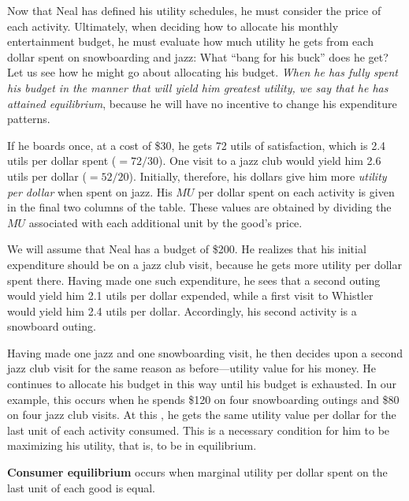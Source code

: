 



Now that Neal has defined his utility schedules, he must consider the price of each activity. Ultimately, when deciding how to allocate his monthly entertainment budget, he must evaluate how much utility he gets from each dollar spent on snowboarding and jazz: What ``bang for his buck'' does he get? Let us see how he might go about allocating his budget. \textit{When he has fully spent his budget in the manner that will yield him greatest utility, we say that he has attained equilibrium}, because he will have no incentive to change his expenditure patterns.

If he boards once, at a cost of \$30, he gets 72 utils of satisfaction, which is 2.4 utils per dollar spent ($=72/30$). One visit to a jazz club would yield him 2.6 utils per dollar ($=52/20$). Initially, therefore, his dollars give him more \textit{utility per dollar} when spent on jazz. His $MU$ per dollar spent on each activity is given in the final two columns of the table. These values are obtained by dividing the $MU$ associated with each additional unit by the good's price.

We will assume that Neal has a budget of \$200. He realizes that his initial expenditure should be on a jazz club visit, because he gets more utility per dollar spent there. Having made one such expenditure, he sees that a second outing would yield him 2.1 utils per dollar expended, while a first visit to Whistler would yield him 2.4 utils per dollar. Accordingly, his second activity is a snowboard outing.

Having made one jazz and one snowboarding visit, he then decides upon a second jazz club visit for the same reason as before---utility value for his money. He continues to allocate his budget in this way until his budget is exhausted. In our example, this occurs when he spends \$120 on four snowboarding outings and \$80 on four jazz club visits. At this , he gets the same utility value per dollar for the last unit of each activity consumed. This is a necessary condition for him to be maximizing his utility, that is, to be in equilibrium.

\begin{DefBox}
\textbf{Consumer equilibrium} occurs when marginal utility per dollar spent on the last unit of each good is equal.
\end{DefBox}

